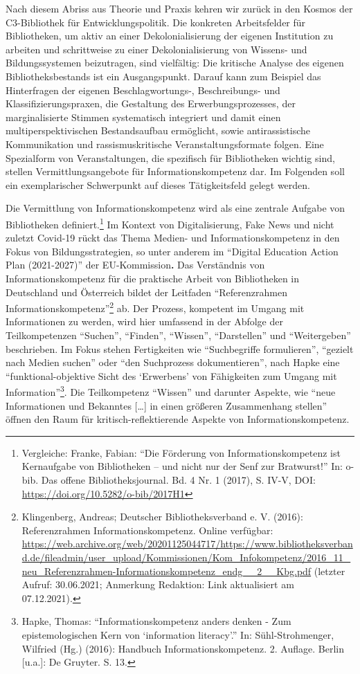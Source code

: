 \documentclass[a4paper,
fontsize=11pt,
oneside,
numbers=noperiodatend,
parskip=half-,
bibliography=totoc,
final
]{scrartcl}
\begin{document}
Nach diesem Abriss aus Theorie und Praxis kehren wir zurück in den
Kosmos der C3-Bibliothek für Entwicklungspolitik. Die konkreten
Arbeitsfelder für Bibliotheken, um aktiv an einer Dekolonialisierung der
eigenen Institution zu arbeiten und schrittweise zu einer
Dekolonialisierung von Wissens- und Bildungssystemen beizutragen, sind
vielfältig: Die kritische Analyse des eigenen Bibliotheksbestands ist
ein Ausgangspunkt. Darauf kann zum Beispiel das Hinterfragen der eigenen
Beschlagwortungs-, Beschreibungs- und Klassifizierungspraxen, die
Gestaltung des Erwerbungsprozesses, der marginalisierte Stimmen
systematisch integriert und damit einen multiperspektivischen
Bestandsaufbau ermöglicht, sowie antirassistische Kommunikation und
rassismuskritische Veranstaltungsformate folgen. Eine Spezialform von
Veranstaltungen, die spezifisch für Bibliotheken wichtig sind, stellen
Vermittlungsangebote für Informationskompetenz dar. Im Folgenden soll
ein exemplarischer Schwerpunkt auf dieses Tätigkeitsfeld gelegt werden.

Die Vermittlung von Informationskompetenz wird als eine zentrale Aufgabe
von Bibliotheken definiert.\footnote{Vergleiche: Franke, Fabian:
  \enquote{Die Förderung von Informationskompetenz ist Kernaufgabe von
  Bibliotheken -- und nicht nur der Senf zur Bratwurst!} In: o-bib. Das
  offene Bibliotheksjournal. Bd. 4 Nr. 1 (2017), S. IV-V, DOI:
  \url{https://doi.org/10.5282/o-bib/2017H1}} Im Kontext von
Digitalisierung, Fake News und nicht zuletzt Covid-19 rückt das Thema
Medien- und Informationskompetenz in den Fokus von Bildungsstrategien,
so unter anderem im \enquote{Digital Education Action Plan (2021-2027)}
der EU-Kommission\textbf{.} Das Verständnis von Informationskompetenz
für die praktische Arbeit von Bibliotheken in Deutschland und Österreich
bildet der Leitfaden \enquote{Referenzrahmen
Informationskompetenz}\footnote{Klingenberg, Andreas; Deutscher
  Bibliotheksverband e. V. (2016): Referenzrahmen Informationskompetenz.
  Online verfügbar:
  \url{https://web.archive.org/web/20201125044717/https://www.bibliotheksverband.de/fileadmin/user_upload/Kommissionen/Kom_Infokompetenz/2016_11_neu_Referenzrahmen-Informationskompetenz_endg__2__Kbg.pdf}
  (letzter Aufruf: 30.06.2021; Anmerkung Redaktion: Link aktualisiert am
  07.12.2021).} ab. Der Prozess, kompetent im Umgang mit Informationen
zu werden, wird hier umfassend in der Abfolge der Teilkompetenzen
\enquote{Suchen}, \enquote{Finden}, \enquote{Wissen},
\enquote{Darstellen} und \enquote{Weitergeben} beschrieben. Im Fokus
stehen Fertigkeiten wie \enquote{Suchbegriffe formulieren},
\enquote{gezielt nach Medien suchen} oder \enquote{den Suchprozess
dokumentieren}, nach Hapke eine \enquote{funktional-objektive Sicht des
\enquote*{Erwerbens} von Fähigkeiten zum Umgang mit
Information}\footnote{Hapke, Thomas: \enquote{Informationskompetenz
  anders denken - Zum epistemologischen Kern von \enquote*{information
  literacy}.} In: Sühl-Strohmenger, Wilfried (Hg.) (2016): Handbuch
  Informationskompetenz. 2. Auflage. Berlin {[}u.a.{]}: De Gruyter. S.
  13.}. Die Teilkompetenz \enquote{Wissen} und darunter Aspekte, wie
\enquote{neue Informationen und Bekanntes {[}\ldots{]} in einen größeren
Zusammenhang stellen} öffnen den Raum für kritisch-reflektierende
Aspekte von Informationskompetenz.
\end{document}
